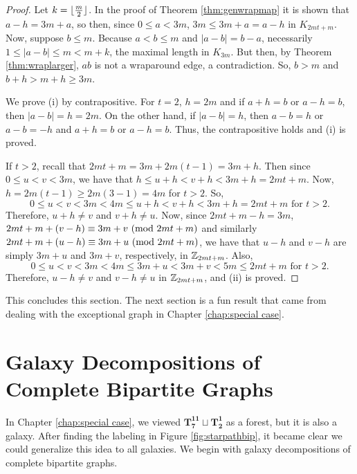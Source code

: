 \begin{proof}
    Let $k=\lfloor\frac{m}{2}\rfloor$. In the proof of Theorem \ref{thm:genwrapmap} it is shown that $a-h=3m+a$, so then, since $0\leq a<3m$, $3m\leq 3m+a=a-h$ in $K_{2mt+m}$. Now, suppose $b\leq m$. Because $a<b\leq m$ and $|a-b|=b-a$, necessarily $1\leq |a-b|\leq m<m+k$, the maximal length in $K_{3m}$. But then, by Theorem \ref{thm:wraplarger}, $ab$ is not a wraparound edge, a contradiction. So, $b>m$ and $b+h>m+h\geq 3m$.\newline

    \noindent We prove (i) by contrapositive. For $t=2$, $h=2m$ and if $a+h = b$ or $a-h=b$, then $|a-b|=h=2m$. On the other hand, if $|a-b|=h$, then $a-b=h$ or $a-b=-h$ and $a+h = b$ or $a-h=b$. Thus, the contrapositive holds and (i) is proved.\newline

    \noindent If $t>2$, recall that $2mt+m=3m+2m(t-1)=3m+h$. Then since $0\leq u<v<3m$, we have that $h\leq u+h<v+h<3m+h=2mt+m$. Now, $h=2m(t-1)\geq 2m(3-1)=4m$ for $t>2$. So, $$0\leq u<v<3m<4m \leq u+h<v+h<3m+h=2mt+m\text{ for }t>2.$$ Therefore, $u+h\neq v$ and $v+ h\neq u$. Now, since $2mt+m-h=3m$, $2mt+m+(v-h)\equiv 3m+v\ (\mathrm{mod}\ 2mt+m)$ and similarly $2mt+m+(u-h)\equiv 3m+u\ (\mathrm{mod}\ 2mt+m)$, we have that $u-h$ and $v-h$ are simply $3m+u$ and $3m+v$, respectively, in $\mathbb{Z}_{2mt+m}$. Also, $$0\leq u<v<3m<4m\leq 3m+u<3m+v<5m\leq 2mt+m\text{ for }t>2.$$
    Therefore, $u-h\neq v$ and $v-h\neq u$ in $\mathbb{Z}_{2mt+m}$, and (ii) is proved.

\end{proof}
    This concludes this section. The next section is a fun result that came from dealing with the exceptional graph in Chapter \ref{chap:special case}.

\section{Galaxy Decompositions of Complete Bipartite Graphs}

In Chapter \ref{chap:special case}, we viewed $\mathbf{T_{7}^{11}}\sqcup\mathbf{T_{2}^{1}}$ as a forest, but it is also a galaxy. After finding the labeling in Figure \ref{fig:starpathbip}, it became clear we could generalize this idea to all galaxies. We begin with galaxy decompositions of complete bipartite graphs.

